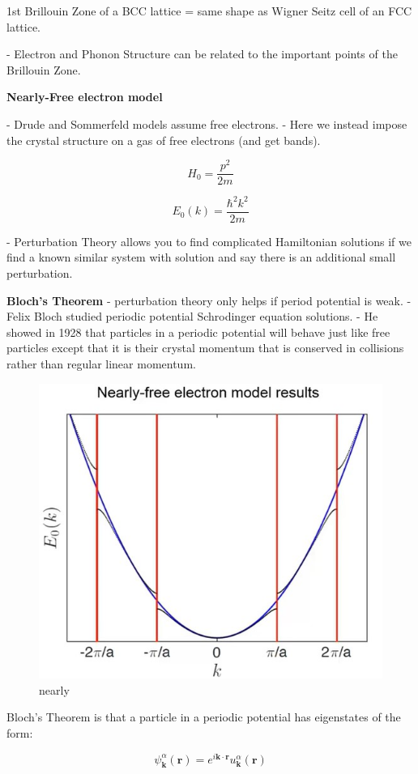 1st Brillouin Zone of a BCC lattice = same shape as Wigner Seitz cell of an FCC lattice.


- Electron and Phonon Structure can be related to the important points of the Brillouin Zone.



\textbf{Nearly-Free electron model}

- Drude and Sommerfeld models assume free electrons.
- Here we instead impose the crystal structure on a gas of free electrons (and get bands).


\[ H_0 = \frac{p^2}{2m} \]

\[E_0(k) = \frac{\hbar^2k^2}{2m} \]

- Perturbation Theory allows you to find complicated Hamiltonian solutions if we find a known similar system with solution and say there is an additional small perturbation.

 \textbf{Bloch's Theorem}
 - perturbation theory only helps if period potential is weak. 
 - Felix Bloch studied periodic potential Schrodinger equation solutions. 
 - He showed in 1928 that particles in a periodic potential will behave just like free particles except that it is their crystal momentum that is conserved in collisions rather than regular linear momentum.
 
 \begin{figure}
  \includegraphics[width=0.75\linewidth]{Images/NearlyFree.jpg}
  \caption{nearly}
  \label{fig:nearly}
\end{figure}
 
 
 Bloch's Theorem is that a particle in a periodic potential has eigenstates of the form:
 
 \begin{tcolorbox}[enhanced,attach boxed title to top center={yshift=-3mm,yshifttext=-1mm},
  colback=blue!5!white,colframe=blue!75!black,colbacktitle=red!80!black,
  title=Bloch's Theorem,fonttitle=\bfseries,
  boxed title style={size=small,colframe=red!50!black} ]
  \begin{equation}
      \psi_\textbf{k}^\alpha (\textbf{r}) = e^{i\textbf{k}\cdot \textbf{r}}u_\textbf{k}^\alpha (\textbf{r}) 
  \end{equation}
\end{tcolorbox}

